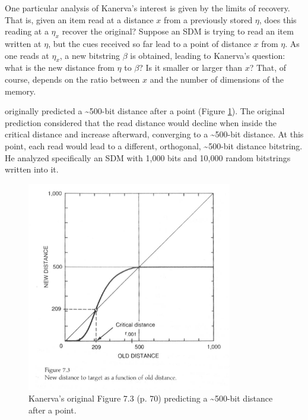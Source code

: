 
One particular analysis of Kanerva's interest is given by the limits of recovery.  That is, given an item read at a distance $x$ from a previously stored $\eta$, does this reading at a $\eta_x$ recover the original? Suppose an SDM is trying to read an item written at $\eta$, but the cues received so far lead to a point of distance $x$ from $\eta$.  As one reads at $\eta_x$, a new bitstring $\beta$ is obtained, leading to Kanerva's question: what is the new distance from $\eta$ to $\beta$? Is it smaller or larger than $x$? That, of course, depends on the ratio between $x$ and the number of dimensions of the memory.

\citet[p.70]{Kanerva1988} originally predicted a \textasciitilde 500-bit distance after a point (Figure \ref{fig:kanerva-figure-7.3}). The original prediction considered that the read distance would decline when inside the critical distance and increase afterward, converging to a \textasciitilde 500-bit distance.  At this point, each read would lead to a different, orthogonal, \textasciitilde 500-bit distance bitstring. He analyzed specifically an SDM with 1,000 bits and 10,000 random bitstrings written into it.

\begin{figure}[h]
\centering\includegraphics[width=0.8\textwidth]{images02/kanerva-table-7-2-original.png}
\caption{Kanerva's original Figure 7.3 (p. 70) predicting a \textasciitilde 500-bit distance after a point.
\label{fig:kanerva-figure-7.3}}
\end{figure}
 
